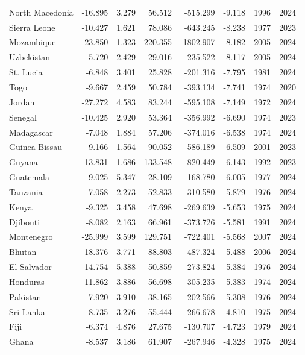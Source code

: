 \begin{table}[p]
{\begin{tabular}{lrrrrrrr}
  North Macedonia & -16.895 & 3.279 & 56.512 & -515.299 & -9.118 & 1996 & 2024 \\ 
  Sierra Leone & -10.427 & 1.621 & 78.086 & -643.245 & -8.238 & 1977 & 2023 \\ 
  Mozambique & -23.850 & 1.323 & 220.355 & -1802.907 & -8.182 & 2005 & 2024 \\ 
  Uzbekistan & -5.720 & 2.429 & 29.016 & -235.522 & -8.117 & 2005 & 2024 \\ 
  St. Lucia & -6.848 & 3.401 & 25.828 & -201.316 & -7.795 & 1981 & 2024 \\ 
  Togo & -9.667 & 2.459 & 50.784 & -393.134 & -7.741 & 1974 & 2020 \\ 
  Jordan & -27.272 & 4.583 & 83.244 & -595.108 & -7.149 & 1972 & 2024 \\ 
  Senegal & -10.425 & 2.920 & 53.364 & -356.992 & -6.690 & 1974 & 2023 \\ 
  Madagascar & -7.048 & 1.884 & 57.206 & -374.016 & -6.538 & 1974 & 2024 \\ 
  Guinea-Bissau & -9.166 & 1.564 & 90.052 & -586.189 & -6.509 & 2001 & 2023 \\ 
  Guyana & -13.831 & 1.686 & 133.548 & -820.449 & -6.143 & 1992 & 2023 \\ 
  Guatemala & -9.025 & 5.347 & 28.109 & -168.780 & -6.005 & 1977 & 2024 \\ 
  Tanzania & -7.058 & 2.273 & 52.833 & -310.580 & -5.879 & 1976 & 2024 \\ 
  Kenya & -9.325 & 3.458 & 47.698 & -269.639 & -5.653 & 1975 & 2024 \\ 
  Djibouti & -8.082 & 2.163 & 66.961 & -373.726 & -5.581 & 1991 & 2024 \\ 
  Montenegro & -25.999 & 3.599 & 129.751 & -722.401 & -5.568 & 2007 & 2024 \\ 
  Bhutan & -18.376 & 3.771 & 88.803 & -487.324 & -5.488 & 2006 & 2024 \\ 
  El Salvador & -14.754 & 5.388 & 50.859 & -273.824 & -5.384 & 1976 & 2024 \\ 
  Honduras & -11.862 & 3.886 & 56.698 & -305.235 & -5.383 & 1974 & 2024 \\ 
  Pakistan & -7.920 & 3.910 & 38.165 & -202.566 & -5.308 & 1976 & 2024 \\ 
  Sri Lanka & -8.735 & 3.276 & 55.444 & -266.678 & -4.810 & 1975 & 2024 \\ 
  Fiji & -6.374 & 4.876 & 27.675 & -130.707 & -4.723 & 1979 & 2024 \\ 
  Ghana & -8.537 & 3.186 & 61.907 & -267.946 & -4.328 & 1975 & 2024 \\ 

\end{tabular}}
\end{table}
